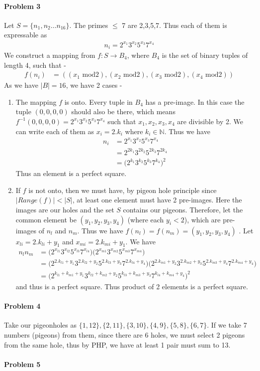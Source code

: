 \documentclass[12pt]{scrartcl}
\begin{document}
\paragraph*{Problem 3 } 
Let $S = \{n_1, n_2 \ldots n_{16}\}$. The primes $\leq$ 7 are 2,3,5,7. Thus each of them is expressable as 
\begin{align*}
    n_i = 2^{x_1} 3^{x_2} 5^{x_3} 7^{x_4}
\end{align*}
We construct a mapping from $f:S \rightarrow B_4$, where  $B_4$ is the set of binary tuples of length 4, such that - 
\begin{align*}
    f(n_i) &= (({x_1} \text{ mod} 2),(x_2 \text{ mod} 2), (x_3 \text{ mod} 2), (x_4 \text{ mod} 2) )
\end{align*}
As we have $|B| = 16$, we have 2 cases - 
\begin{enumerate}
    \item The mapping $f$ is onto. Every tuple in $B_4$ has a pre-image.  In this case the tuple $(0,0,0,0)$ should also be there, which means $f^{-1}(0,0,0,0) = 2^{x_1} 3^{x_2} 5^{x_3} 7^{x_4}$ such that $x_1,x_2,x_3,x_4$ are divisible by 2. We can write each of them as $x_i = 2.k_i$ where $k_i \in \mathbb{N}$. Thus we have
    \begin{align*}
        n_i &= 2^{x_1} 3^{x_2} 5^{x_3} 7^{x_4}
        \\ &= 2^{2k_1} 3^{2k_2} 5^{2k_3} 7^{2k_4}
        \\ &= \big( 2^{k_1} 3^{k_2} 5^{k_3} 7^{k_4} \big)^2
    \end{align*}
    Thus an element is a perfect square.
    \item If $f$ is not onto, then we must have, by pigeon hole principle since $|Range(f)| < |S|$, at least one element must have 2 pre-images. Here the images are our holes and the set $S$ contains our pigeons. Therefore, let the common element be $(y_1,y_2,y_3,y_4)$ (where each $y_i < 2$), which are pre-images of $n_l$ and $n_m$. Thus we have $f(n_l) = f(n_m) =(y_1,y_2,y_3,y_4)$ . Let $x_{li} = 2.k_{li} + y_1$ and $x_{mi} = 2.k_{mi} + y_1$. We have
    \begin{align*}
        n_l n_m &= \big(2^{x_{l1}} 3^{x_{l2}} 5^{x_{l3}} 7^{x_{l4}} \big) \big(2^{x_{m1}} 3^{x_{m2}} 5^{x_{m3}} 7^{x_{m4}}\big)
        \\ &= \big(2^{2.k_{l1} + y_1} 3^{2.k_{l2} + y_2} 5^{2.k_{l3} + y_3} 7^{2.k_{l4} + y_4} \big)\big(2^{2.k_{m1} + y_2} 3^{2.k_{m2} + y_3} 5^{2.k_{m3} + y_4} 7^{2.k_{m4} + y_4}\big)
        \\ &= \big(2^{k_{l1} + k_{m1} + y_1} 3^{k_{l2} + k_{m2} + y_2} 5^{k_{l3} + k_{m3} + y_3} 7^{k_{l4} + k_{m4} + y_4}  \big)^2
    \end{align*}
    and thus is a perfect square. Thus product of 2 elements is a perfect square.
\end{enumerate}
\paragraph*{Problem 4 }
Take our pigeonholes as $\{1,12\},\{2,11\},\{3,10\},\{4,9\},\{5,8\},\{6,7\}$. If we take 7 numbers (pigeons) from them, since there are 6 holes, we must select 2 pigeons from the same hole, thus by PHP, we have at least 1 pair must sum to 13.

\paragraph*{Problem 5 }
\end{document}
